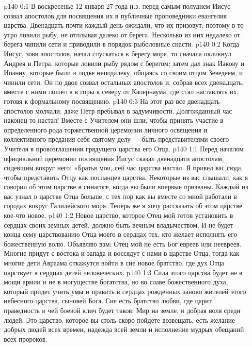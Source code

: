 \vs p140 0:1 В воскресенье 12 января 27 года н.э. перед самым полуднем Иисус созвал апостолов для посвящения их в публичные проповедники евангелия царства. Двенадцать почти каждый день ожидали, что их призовут; поэтому в то утро ловили рыбу, не отплывая далеко от берега. Несколько из них недалеко от берега чинили сети и приводили в порядок рыболовные снасти.
\vs p140 0:2 Когда Иисус, зовя апостолов, начал спускаться к берегу моря, то сначала окликнул Андрея и Петра, которые ловили рыбу рядом с берегом; затем дал знак Иакову и Иоанну, которые были в лодке неподалеку, общаясь со своим отцом Зеведеем, и чинили сети. Он по двое созвал остальных апостолов и, собрав всех двенадцать, вместе с ними пошел в в горы к северу от Капернаума, где стал наставлять их, готовя к формальному посвящению.
\vs p140 0:3 На этот раз все двенадцать апостолов молчали; даже Петр пребывал в задумчивости. Долгожданный час наконец\hyp{}то настал! Вместе с Учителем они шли, чтобы принять участие в определенного рода торжественной церемонии личного освящения и коллективного предания себя святому делу --- быть представителями своего Учителя в провозглашении грядущего царства его Отца.
\vs p140 1:1 Перед началом официальной церемонии посвящения Иисус сказал двенадцати апостолам, сидевшим вокруг него: «Братья мои, сей час царства настал. Я привел вас сюда, чтобы представить Отцу как посланцев царства. Некоторые из вас слышали, как я говорил об этом царстве в синагоге, когда вы были впервые призваны. Каждый из вас узнал о царстве Отца больше, с тех пор как вы вместе со мной работали в городах вокруг Галилейского моря. Теперь же я хочу рассказать об этом царстве кое\hyp{}что новое.
\vs p140 1:2 Новое царство, которое Отец мой готов установить в сердцах своих земных детей, должно быть вечным владычеством. И не будет конца сему царствованию Отца моего в сердцах тех, кто желает исполнять его божественную волю. Объявляю вам: Отец мой не есть Бог евреев или неевреев. Многие придут с востока и запада и воссядут с нами в царстве Отца, тогда как многие дети Авраама откажутся войти в сие новое братство, где дух Отца царствует в сердцах детей человеческих.
\vs p140 1:3 Сила этого царства будет не в мощи армии и не в могуществе богатства, но во славе божественного духа, который придет учить умы и править в сердцах рожденных заново жителей этого небесного царства, сыновей Бога. Сие есть братство любви, где царит праведность и чей боевой клич будет таков: Мир на земле, и добрая воля среди людей. Это царство, которое вы столь скоро пойдете возвещать, есть желание добрых людей всех времен, надежда всей земли и исполнение мудрых обещаний всех пророков.
